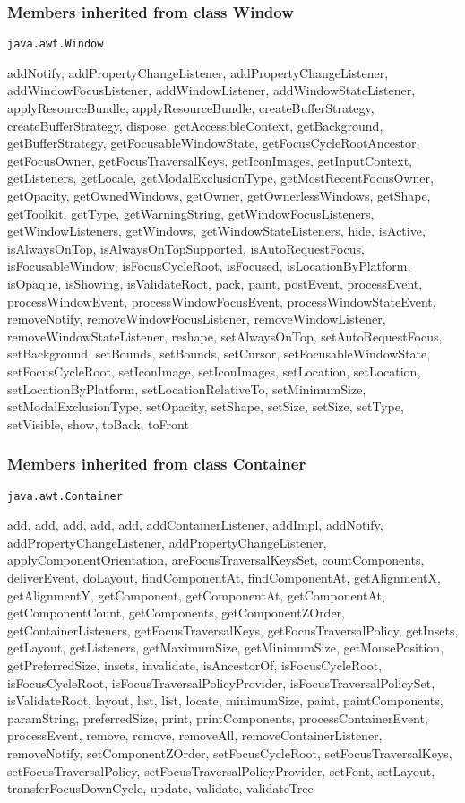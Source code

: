 {{{{{{{\subsubsection{Members inherited from class Window }{
\texttt{java.awt.Window} {\small 
{}}
{\small 

addNotify, addPropertyChangeListener, addPropertyChangeListener, addWindowFocusListener, addWindowListener, addWindowStateListener, applyResourceBundle, applyResourceBundle, createBufferStrategy, createBufferStrategy, dispose, getAccessibleContext, getBackground, getBufferStrategy, getFocusableWindowState, getFocusCycleRootAncestor, getFocusOwner, getFocusTraversalKeys, getIconImages, getInputContext, getListeners, getLocale, getModalExclusionType, getMostRecentFocusOwner, getOpacity, getOwnedWindows, getOwner, getOwnerlessWindows, getShape, getToolkit, getType, getWarningString, getWindowFocusListeners, getWindowListeners, getWindows, getWindowStateListeners, hide, isActive, isAlwaysOnTop, isAlwaysOnTopSupported, isAutoRequestFocus, isFocusableWindow, isFocusCycleRoot, isFocused, isLocationByPlatform, isOpaque, isShowing, isValidateRoot, pack, paint, postEvent, processEvent, processWindowEvent, processWindowFocusEvent, processWindowStateEvent, removeNotify, removeWindowFocusListener, removeWindowListener, removeWindowStateListener, reshape, setAlwaysOnTop, setAutoRequestFocus, setBackground, setBounds, setBounds, setCursor, setFocusableWindowState, setFocusCycleRoot, setIconImage, setIconImages, setLocation, setLocation, setLocationByPlatform, setLocationRelativeTo, setMinimumSize, setModalExclusionType, setOpacity, setShape, setSize, setSize, setType, setVisible, show, toBack, toFront}
\subsubsection{Members inherited from class Container }{
\texttt{java.awt.Container} {\small 
{}}
{\small 

add, add, add, add, add, addContainerListener, addImpl, addNotify, addPropertyChangeListener, addPropertyChangeListener, applyComponentOrientation, areFocusTraversalKeysSet, countComponents, deliverEvent, doLayout, findComponentAt, findComponentAt, getAlignmentX, getAlignmentY, getComponent, getComponentAt, getComponentAt, getComponentCount, getComponents, getComponentZOrder, getContainerListeners, getFocusTraversalKeys, getFocusTraversalPolicy, getInsets, getLayout, getListeners, getMaximumSize, getMinimumSize, getMousePosition, getPreferredSize, insets, invalidate, isAncestorOf, isFocusCycleRoot, isFocusCycleRoot, isFocusTraversalPolicyProvider, isFocusTraversalPolicySet, isValidateRoot, layout, list, list, locate, minimumSize, paint, paintComponents, paramString, preferredSize, print, printComponents, processContainerEvent, processEvent, remove, remove, removeAll, removeContainerListener, removeNotify, setComponentZOrder, setFocusCycleRoot, setFocusTraversalKeys, setFocusTraversalPolicy, setFocusTraversalPolicyProvider, setFont, setLayout, transferFocusDownCycle, update, validate, validateTree}
}}}}}}}}}
